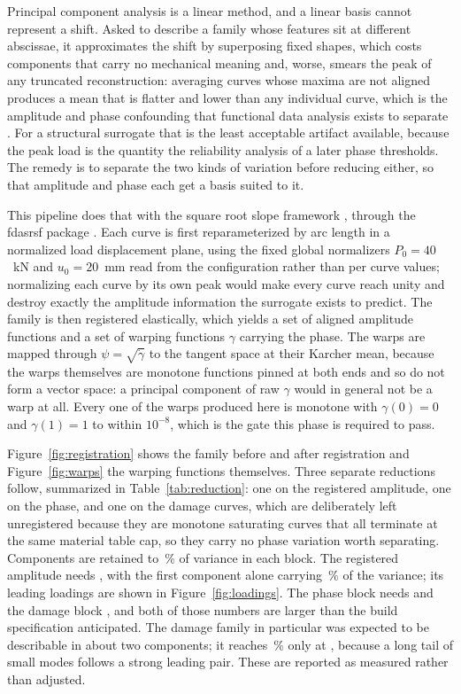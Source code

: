 \documentclass[11pt,a4paper]{article}
\begin{document}
Principal component analysis is a linear method, and a linear basis cannot represent a shift. Asked to describe a family whose features sit at different abscissae, it approximates the shift by superposing fixed shapes, which costs components that carry no mechanical meaning and, worse, smears the peak of any truncated reconstruction: averaging curves whose maxima are not aligned produces a mean that is flatter and lower than any individual curve, which is the amplitude and phase confounding that functional data analysis exists to separate \cite{marron2015}. For a structural surrogate that is the least acceptable artifact available, because the peak load is the quantity the reliability analysis of a later phase thresholds. The remedy is to separate the two kinds of variation before reducing either, so that amplitude and phase each get a basis suited to it.

This pipeline does that with the square root slope framework \cite{tucker2013,srivastava2016}, through the fdasrsf package \cite{fdasrsf}. Each curve is first reparameterized by arc length in a normalized load displacement plane, using the fixed global normalizers $P_0 = 40$~kN and $u_0 = 20$~mm read from the configuration rather than per curve values; normalizing each curve by its own peak would make every curve reach unity and destroy exactly the amplitude information the surrogate exists to predict. The family is then registered elastically, which yields a set of aligned amplitude functions and a set of warping functions $\gamma$ carrying the phase. The warps are mapped through $\psi = \sqrt{\dot{\gamma}}$ to the tangent space at their Karcher mean, because the warps themselves are monotone functions pinned at both ends and so do not form a vector space: a principal component of raw $\gamma$ would in general not be a warp at all. Every one of the \NValid{} warps produced here is monotone with $\gamma(0) = 0$ and $\gamma(1) = 1$ to within $10^{-8}$, which is the gate this phase is required to pass.

Figure~\ref{fig:registration} shows the family before and after registration and Figure~\ref{fig:warps} the warping functions themselves. Three separate reductions follow, summarized in Table~\ref{tab:reduction}: one on the registered amplitude, one on the phase, and one on the damage curves, which are deliberately left unregistered because they are monotone saturating curves that all terminate at the same material table cap, so they carry no phase variation worth separating. Components are retained to \VarianceTarget\,\% of variance in each block. The registered amplitude needs \ComponentsAmplitude{}, with the first component alone carrying \AmplitudePCOne\,\% of the variance; its leading loadings are shown in Figure~\ref{fig:loadings}. The phase block needs \ComponentsPhase{} and the damage block \ComponentsDamage{}, and both of those numbers are larger than the build specification anticipated. The damage family in particular was expected to be describable in about two components; it reaches \VarianceDamage\,\% only at \ComponentsDamage{}, because a long tail of small modes follows a strong leading pair. These are reported as measured rather than adjusted.
\end{document}
